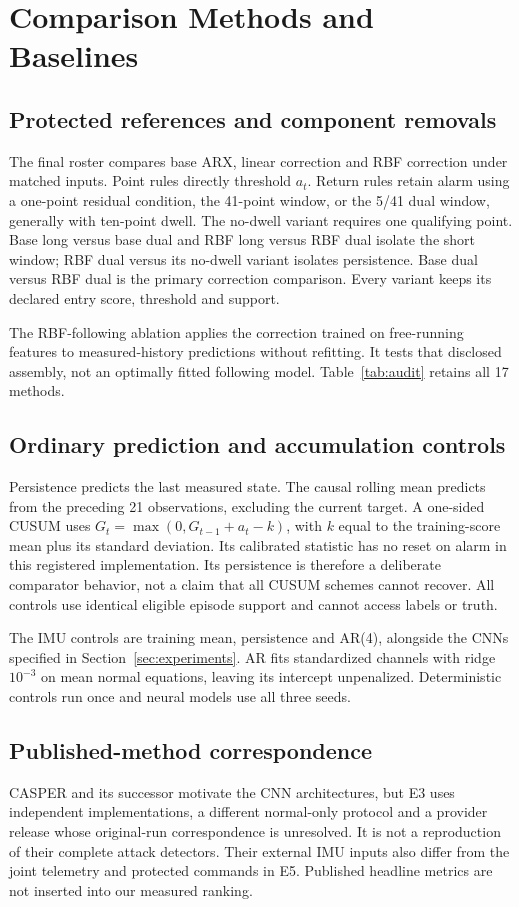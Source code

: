 \section{Comparison Methods and Baselines}\label{sec:comparators}
\subsection{Protected references and component removals}
The final roster compares base ARX, linear correction and RBF correction under matched inputs. Point rules directly threshold $a_t$. Return rules retain alarm using a one-point residual condition, the 41-point window, or the 5/41 dual window, generally with ten-point dwell. The no-dwell variant requires one qualifying point. Base long versus base dual and RBF long versus RBF dual isolate the short window; RBF dual versus its no-dwell variant isolates persistence. Base dual versus RBF dual is the primary correction comparison. Every variant keeps its declared entry score, threshold and support.

The RBF-following ablation applies the correction trained on free-running features to measured-history predictions without refitting. It tests that disclosed assembly, not an optimally fitted following model. Table~\ref{tab:audit} retains all 17 methods.

\subsection{Ordinary prediction and accumulation controls}
Persistence predicts the last measured state. The causal rolling mean predicts from the preceding 21 observations, excluding the current target. A one-sided CUSUM uses $G_t=\max(0,G_{t-1}+a_t-k)$, with $k$ equal to the training-score mean plus its standard deviation. Its calibrated statistic has no reset on alarm in this registered implementation. Its persistence is therefore a deliberate comparator behavior, not a claim that all CUSUM schemes cannot recover. All controls use identical eligible episode support and cannot access labels or truth.

The IMU controls are training mean, persistence and AR(4), alongside the CNNs specified in Section~\ref{sec:experiments}. AR fits standardized channels with ridge $10^{-3}$ on mean normal equations, leaving its intercept unpenalized. Deterministic controls run once and neural models use all three seeds.

\subsection{Published-method correspondence}
CASPER and its successor motivate the CNN architectures, but E3 uses independent implementations, a different normal-only protocol and a provider release whose original-run correspondence is unresolved. It is not a reproduction of their complete attack detectors. Their external IMU inputs also differ from the joint telemetry and protected commands in E5. Published headline metrics are not inserted into our measured ranking.

